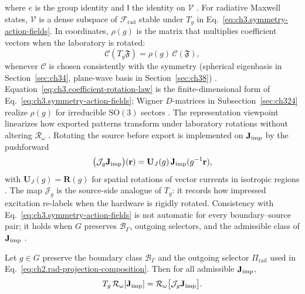 where \(e\) is the group identity and \(\mathsf{I}\) the identity on \(\mathcal{V}\) \cite{jackson1999}. For radiative Maxwell states, \(\mathcal{V}\) is a dense subspace of \(\mathcal{F}_{\mathrm{rad}}\) stable under \(T_g\) in Eq.~\eqref{eq:ch3.symmetry-action-fields}. In coordinates, \(\rho(g)\) is the matrix that multiplies coefficient vectors when the laboratory is rotated:
\begin{equation}
\label{eq:ch3.coefficient-rotation-law}
\mathcal{C}(T_g\mathfrak{F})
=
\rho(g)\,\mathcal{C}(\mathfrak{F}),
\end{equation}
whenever \(\mathcal{C}\) is chosen consistently with the symmetry (spherical eigenbasis in Section~\ref{sec:ch34}, plane-wave basis in Section~\ref{sec:ch38}) \cite{jackson1999}. Equation~\eqref{eq:ch3.coefficient-rotation-law} is the finite-dimensional form of Eq.~\eqref{eq:ch3.symmetry-action-fields}; Wigner \(D\)-matrices in Subsection~\ref{sec:ch324} realize \(\rho(g)\) for irreducible \(\mathrm{SO}(3)\) sectors \cite{jackson1999}. The representation viewpoint linearizes how exported patterns transform under laboratory rotations without altering \(\mathcal{R}_\omega\) \cite{stratton1941}.
Rotating the source before export is implemented on \(\mathbf{J}_{\mathrm{imp}}\) by the pushforward
\begin{equation}
\label{eq:ch3.current-pushforward}
\big(\mathcal{J}_g\mathbf{J}_{\mathrm{imp}}\big)(\mathbf{r})
=
\mathbf{U}_J(g)\,\mathbf{J}_{\mathrm{imp}}(g^{-1}\mathbf{r}),
\end{equation}
with \(\mathbf{U}_J(g)=\mathbf{R}(g)\) for spatial rotations of vector currents in isotropic regions \cite{jackson1999}. The map \(\mathcal{J}_g\) is the source-side analogue of \(T_g\): it records how impressed excitation re-labels when the hardware is rigidly rotated. Consistency with Eq.~\eqref{eq:ch3.symmetry-action-fields} is not automatic for every boundary--source pair; it holds when \(G\) preserves \(\mathcal{B}_\Gamma\), outgoing selectors, and the admissible class of \(\mathbf{J}_{\mathrm{imp}}\) \cite{stratton1941}.
\begin{theorem}
\label{thm:ch3.symmetry-commutes}
Let \(g\in G\) preserve the boundary class \(\mathcal{B}_\Gamma\) and the outgoing selector
\(\Pi_{\mathrm{rad}}\) used in Eq.~\eqref{eq:ch2.rad-projection-composition}. Then for all admissible
\(\mathbf{J}_{\mathrm{imp}}\),
\begin{equation}
\label{eq:ch3.symmetry-commutes-with-radiation}
T_g\,\mathcal{R}_\omega[\mathbf{J}_{\mathrm{imp}}]
=
\mathcal{R}_\omega\big[\mathcal{J}_g\mathbf{J}_{\mathrm{imp}}\big].
\end{equation}
\end{theorem}
